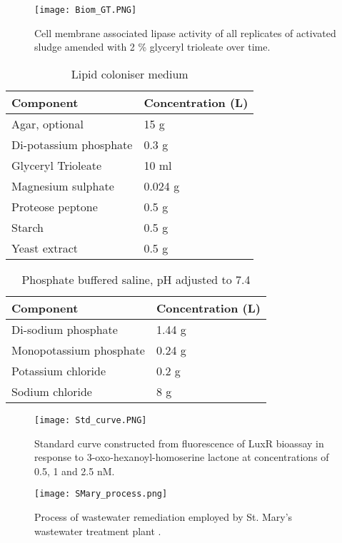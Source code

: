 \documentclass[twoside]{article}
\begin{document}
\begin{figure}
\texttt{[image: Biom\_GT.PNG]}
\caption{Cell membrane associated lipase activity of all replicates of activated sludge amended with 2 \% glyceryl trioleate over time.}
\end{figure}
\FloatBarrier

\begin{table}
\caption{Lipid coloniser medium}
\begin{tabular}{  p{6.9cm} | p{6.9cm} }
\hline
Component & Concentration (L) \\
\hline
Agar, optional  & 15 g  \\
  Di-potassium phosphate  & 0.3 g \\
   Glyceryl Trioleate   & 10 ml \\
      Magnesium sulphate  & 0.024 g  \\
       Proteose peptone   & 0.5 g \\
          Starch  & 0.5 g \\
           Yeast extract   & 0.5 g \\
  \hline
\end{tabular}
\end{table}


\begin{table}
\caption{Phosphate buffered saline, pH adjusted to 7.4}
\begin{tabular}{  p{6.9cm} | p{6.9cm}  }
\hline
Component & Concentration (L) \\
\hline
Di-sodium phosphate  & 1.44 g \\
  Monopotassium phosphate  & 0.24 g  \\
    Potassium chloride  &  0.2 g  \\
      Sodium chloride  & 8 g  \\
  \hline
\end{tabular}
\end{table}

\begin{figure}
\texttt{[image: Std\_curve.PNG]}
\caption{Standard curve constructed from fluorescence of LuxR bioassay in response to 3-oxo-hexanoyl-homoserine lactone at concentrations of 0.5, 1 and 2.5 nM.}
\end{figure}
\FloatBarrier

\begin{figure}
\texttt{[image: SMary\_process.png]}
\caption{Process of wastewater remediation employed by St. Mary's wastewater treatment plant \cite{stmarys}.}
\end{figure}
\FloatBarrier
\end{document}
